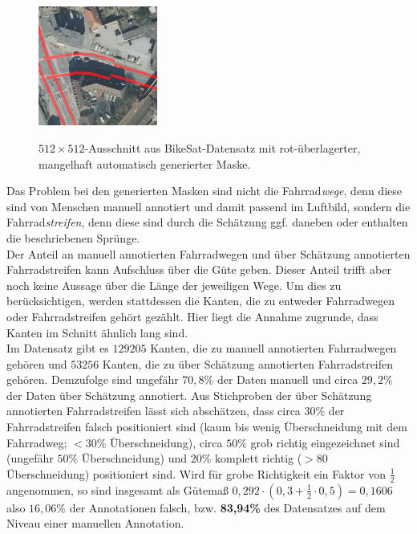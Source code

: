\begin{figure}
	\centering
	\vspace{-30pt} %
	\includegraphics[width=0.35\textwidth]{Bilder/bad-mask-example.png}
	\vspace{-10pt}
	\caption[Schlechte Maske eines $512{\times}512$-Ausschnittes aus BikeSat-Datensatz.]{\unskip}
	$512{\times}512$-Ausschnitt aus BikeSat-Datensatz mit rot-überlagerter, mangelhaft automatisch generierter Maske.
	\label{fig:bad-mask}
\end{figure}

Das Problem bei den generierten Masken sind nicht die Fahrrad\textit{wege}, denn diese sind von Menschen manuell annotiert und damit passend im Luftbild, 
sondern die Fahrrad\textit{streifen}, denn diese sind durch die Schätzung ggf. daneben oder enthalten die beschriebenen Sprünge. \\
Der Anteil an manuell annotierten Fahrradwegen und über Schätzung annotierten Fahrradstreifen kann Aufschluss über die Güte geben. 
Dieser Anteil trifft aber noch keine Aussage über die Länge der jeweiligen Wege. Um dies zu berücksichtigen, werden stattdessen die Kanten, die zu 
entweder Fahrradwegen oder Fahrradstreifen gehört gezählt. Hier liegt die Annahme zugrunde, dass Kanten im Schnitt ähnlich lang sind.\\
Im Datensatz gibt es $129205$ Kanten, die zu manuell annotierten Fahrradwegen gehören und $53256$ Kanten, die zu über Schätzung annotierten Fahrradstreifen gehören. 
Demzufolge sind ungefähr $70,8\%$ der Daten manuell und circa $29,2\%$ der Daten über Schätzung annotiert. 
Aus Stichproben der über Schätzung annotierten Fahrradstreifen lässt sich abschätzen, dass circa $30\%$ der Fahrradstreifen falsch 
positioniert sind 
(kaum bis wenig Überschneidung mit dem Fahrradweg; $<30\%$ Überschneidung), circa $50\%$ grob richtig eingezeichnet sind (ungefähr $50\%$ Überschneidung)
und $20\%$ komplett richtig ($>80$ Überschneidung) positioniert sind. Wird für grobe Richtigkeit ein Faktor von $\frac{1}{2}$ angenommen, so sind insgesamt
als Gütemaß $0,292 \cdot (0,3 + \frac{1}{2} \cdot 0,5) = 0,1606$ also $16,06\%$ der Annotationen falsch, bzw. 
\textbf{83,94\%} des Datensatzes auf dem Niveau einer manuellen Annotation. 

